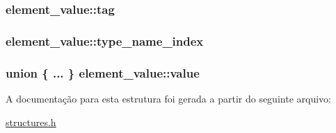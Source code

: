 \subsubsection[{\texorpdfstring{tag}{tag}}]{ element\+\_\+value\+::tag}\hypertarget{structelement__value_a2664460cf3cbd50f7116dcc6fc5dc049}{}\label{structelement__value_a2664460cf3cbd50f7116dcc6fc5dc049}
\subsubsection[{\texorpdfstring{type\+\_\+name\+\_\+index}{type_name_index}}]{ element\+\_\+value\+::type\+\_\+name\+\_\+index}\hypertarget{structelement__value_ad1925807cc4b5a79fa7fa56d46462ecb}{}\label{structelement__value_ad1925807cc4b5a79fa7fa56d46462ecb}
\subsubsection[{\texorpdfstring{value}{value}}]{\setlength{\rightskip}{0pt plus 5cm}union \{ ... \}   element\+\_\+value\+::value}\hypertarget{structelement__value_a4d0a32ca39ecb90de9af608585c10054}{}\label{structelement__value_a4d0a32ca39ecb90de9af608585c10054}


A documentação para esta estrutura foi gerada a partir do seguinte arquivo\+:\begin{DoxyCompactItemize}
\item 
\hyperlink{structures_8h}{structures.\+h}\end{DoxyCompactItemize}
